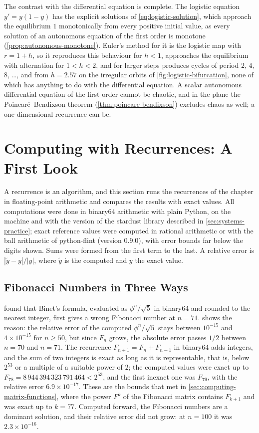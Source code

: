 The contrast with the differential equation is complete. The logistic equation $y'=y(1-y)$ has the explicit solutions of \eqref{eq:logistic-solution}, which approach the equilibrium $1$ monotonically from every positive initial value, as every solution of an autonomous equation of the first order is monotone (\cref{prop:autonomous-monotone}). Euler's method for it is the logistic map with $r=1+h$, so it reproduces this behaviour for $h<1$, approaches the equilibrium with alternation for $1<h<2$, and for larger steps produces cycles of period $2$, $4$, $8$, \ldots, and from $h=2.57$ on the irregular orbits of \cref{fig:logistic-bifurcation}, none of which has anything to do with the differential equation. A scalar autonomous differential equation of the first order cannot be chaotic, and in the plane the Poincar\'e--Bendixson theorem (\cref{thm:poincare-bendixson}) excludes chaos as well; a one-dimensional recurrence can be.

\section{Computing with Recurrences: A First Look}
\label{sec:recurrence-computation}

A recurrence is an algorithm, and this section runs the recurrences of the chapter in floating-point arithmetic and compares the results with exact values. All computations were done in binary64 arithmetic with plain Python, on the machine and with the version of the stardust library described in \cref{sec:systems-practice}; exact reference values were computed in rational arithmetic or with the ball arithmetic of python-flint (version 0.9.0), with error bounds far below the digits shown. Sums were formed from the first term to the last. A relative error is $|\tilde y-y|/|y|$, where $\tilde y$ is the computed and $y$ the exact value.

\subsection{Fibonacci Numbers in Three Ways}

 found that Binet's formula, evaluated as $\phi^n/\sqrt5$ in binary64 and rounded to the nearest integer, first gives a wrong Fibonacci number at $n=71$.  shows the reason: the relative error of the computed $\phi^n/\sqrt5$ stays between $10^{-15}$ and $4\times10^{-15}$ for $n\ge50$, but since $F_n$ grows, the absolute error passes $1/2$ between $n=70$ and $n=71$. The recurrence $F_{n+1}=F_n+F_{n-1}$ in binary64 adds integers, and the sum of two integers is exact as long as it is representable, that is, below $2^{53}$ or a multiple of a suitable power of $2$; the computed values were exact up to $F_{78}=8\,944\,394\,323\,791\,464<2^{53}$, and the first inexact one was $F_{79}$, with the relative error $6.9\times10^{-17}$. These are the bounds that  met in \cref{sec:computing-matrix-functions}, where the power $F^k$ of the Fibonacci matrix contains $F_{k+1}$ and was exact up to $k=77$. Computed forward, the Fibonacci numbers are a dominant solution, and their relative error did not grow: at $n=100$ it was $2.3\times10^{-16}$.

